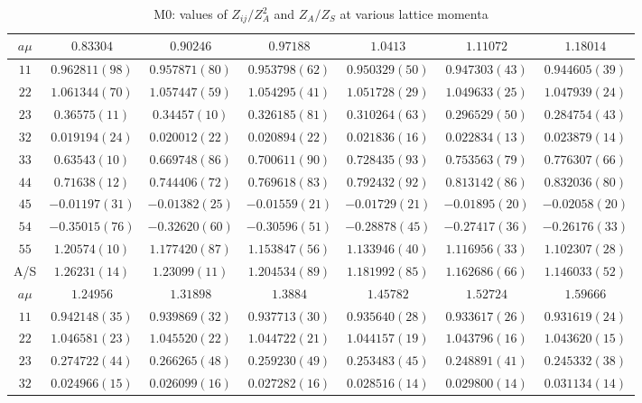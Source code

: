 \begin{table}
\begin{center}
\caption{M0: values of $Z_{ij}/Z_A^2$ and $Z_A/Z_S$ at various lattice momenta}
\begin{tabular}{c|c c c c c c}
\hline
\hline
$a\mu$ & $0.83304$ & $0.90246$ & $0.97188$ & $1.0413$ & $1.11072$ & $1.18014$ \\
\hline
$11$ & $0.962811(98)$ & $0.957871(80)$ & $0.953798(62)$ & $0.950329(50)$ & $0.947303(43)$ & $0.944605(39)$ \\
$22$ & $1.061344(70)$ & $1.057447(59)$ & $1.054295(41)$ & $1.051728(29)$ & $1.049633(25)$ & $1.047939(24)$ \\
$23$ & $0.36575(11)$ & $0.34457(10)$ & $0.326185(81)$ & $0.310264(63)$ & $0.296529(50)$ & $0.284754(43)$ \\
$32$ & $0.019194(24)$ & $0.020012(22)$ & $0.020894(22)$ & $0.021836(16)$ & $0.022834(13)$ & $0.023879(14)$ \\
$33$ & $0.63543(10)$ & $0.669748(86)$ & $0.700611(90)$ & $0.728435(93)$ & $0.753563(79)$ & $0.776307(66)$ \\
$44$ & $0.71638(12)$ & $0.744406(72)$ & $0.769618(83)$ & $0.792432(92)$ & $0.813142(86)$ & $0.832036(80)$ \\
$45$ & $-0.01197(31)$ & $-0.01382(25)$ & $-0.01559(21)$ & $-0.01729(21)$ & $-0.01895(20)$ & $-0.02058(20)$ \\
$54$ & $-0.35015(76)$ & $-0.32620(60)$ & $-0.30596(51)$ & $-0.28878(45)$ & $-0.27417(36)$ & $-0.26176(33)$ \\
$55$ & $1.20574(10)$ & $1.177420(87)$ & $1.153847(56)$ & $1.133946(40)$ & $1.116956(33)$ & $1.102307(28)$ \\
\hline
A/S & $1.26231(14)$ & $1.23099(11)$ & $1.204534(89)$ & $1.181992(85)$ & $1.162686(66)$ & $1.146033(52)$ \\
\hline
$a\mu$ & $1.24956$ & $1.31898$ & $1.3884$ & $1.45782$ & $1.52724$ & $1.59666$ \\
\hline
$11$ & $0.942148(35)$ & $0.939869(32)$ & $0.937713(30)$ & $0.935640(28)$ & $0.933617(26)$ & $0.931619(24)$ \\
$22$ & $1.046581(23)$ & $1.045520(22)$ & $1.044722(21)$ & $1.044157(19)$ & $1.043796(16)$ & $1.043620(15)$ \\
$23$ & $0.274722(44)$ & $0.266265(48)$ & $0.259230(49)$ & $0.253483(45)$ & $0.248891(41)$ & $0.245332(38)$ \\
$32$ & $0.024966(15)$ & $0.026099(16)$ & $0.027282(16)$ & $0.028516(14)$ & $0.029800(14)$ & $0.031134(14)$ \\

\end{tabular}
\end{center}
\end{table}
